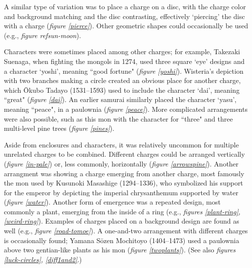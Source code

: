 \documentclass{article}
\begin{document}
  \begin{figure}
  \begin{subfigs}
  \end{subfigs}
  \end{figure}

  A similar type of variation was to place a charge on a disc, with
  the charge color and background matching and the disc contrasting,
  effectively `piercing' the disc with a charge (\emph{figure
  \ref{pierce}}). Other geometric shapes could occasionally
  be used (e.g., \emph{figure ref{sun-moon}}).

  Characters were sometimes placed among other charges; for example,
  Takezaki Suenaga, when fighting the mongols in 1274, used three
  square `eye' designs and a character `yoshi', meaning ``good
  fortune" (\emph{figure \ref{yoshi}}). Wisteria's depiction with two
  branches making a circle created an obvious place for another
  charge, which \=Okubo Tadayo (1531--1593) used to include the
  character `dai', meaning ``great" (\emph{figure \ref{dai}}).
  An earlier samurai similarly placed the character `yasu', meaning ``peace",
  in a paulownia (\emph{figure \ref{peace}}).
  More complicated arrangements were also possible,
  such as this mon with the character for ``three" and
  three multi-level pine trees (\emph{figure \ref{pines}}).
  
  Aside from enclosures and characters,  it was relatively
  uncommon for multiple 
  unrelated charges to be combined.
  Different charges could be arranged vertically (\emph{figure \ref{in-pale}})
    or, less commonly,
  horizontally (\emph{figure \ref{arrowspine}}).
  Another arrangment was showing a charge emerging from another charge,
  most famously the mon used by Kusunoki Masashige (1294--1336),
  who symbolized his support for the emperor by depicting the imperial
  chrysanthemum supported by water (\emph{figure \ref{water}}). Another form of emergence was a repeated design, most commonly a plant,
  emerging from the inside of a ring (e.g., \emph{figures \ref{plant-ring},
  \ref{weird-ring}}).
  Examples of charges placed on a background design
  are found as well (e.g., \emph{figure \ref{road-tomoe}}).
  A one-and-two arrangement with different charges is occasionally found;
  Yamana S\=ozen Mochitoyo (1404--1473) used a paulownia above two
  gentian-like plants as his mon (\emph{figure \ref{twoplants}}). (See also \emph{figures \ref{luck-circles}, \ref{diff1and2}}.)
\end{document}
